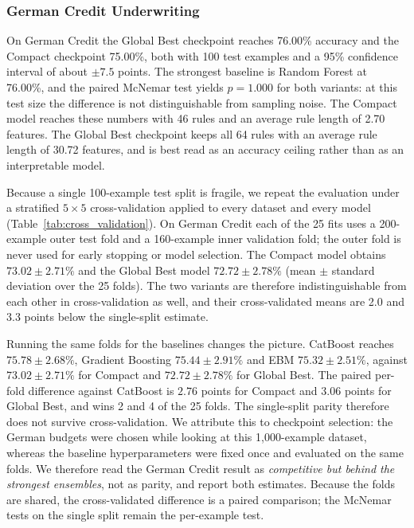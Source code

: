 \subsubsection{German Credit Underwriting}
On German Credit the Global Best checkpoint reaches 76.00\% accuracy and the
Compact checkpoint 75.00\%, both with 100 test examples and a 95\% confidence
interval of about $\pm 7.5$ points. The strongest baseline is Random Forest at
76.00\%, and the paired McNemar test yields $p = 1.000$ for both variants: at
this test size the difference is not distinguishable from sampling noise. The
Compact model reaches these numbers with 46 rules and an average rule length of
2.70 features. The Global Best checkpoint keeps all 64 rules with an average
rule length of 30.72 features, and is best read as an accuracy ceiling rather
than as an interpretable model.

Because a single 100-example test split is fragile, we repeat the evaluation
under a stratified $5\times5$ cross-validation applied to every dataset and every
model (Table~\ref{tab:cross_validation}). On German Credit each of the 25 fits
uses a 200-example outer test fold and a 160-example inner validation fold; the
outer fold is never used for early stopping or model selection. The Compact model
obtains $73.02 \pm 2.71\%$ and the Global Best model $72.72 \pm 2.78\%$ (mean
$\pm$ standard deviation over the 25 folds). The two variants are therefore
indistinguishable from each other in cross-validation as well, and their
cross-validated means are 2.0 and 3.3 points below the single-split estimate.

Running the same folds for the baselines changes the picture. CatBoost reaches
$75.78 \pm 2.68\%$, Gradient Boosting $75.44 \pm 2.91\%$ and EBM
$75.32 \pm 2.51\%$, against $73.02 \pm 2.71\%$ for Compact and
$72.72 \pm 2.78\%$ for Global Best. The paired per-fold difference against
CatBoost is $2.76$ points for Compact and $3.06$ points for Global Best, and
\modelname{} wins 2 and 4 of the 25 folds. The single-split parity therefore does
not survive cross-validation. We attribute this to checkpoint selection: the
German budgets were chosen while looking at this 1{,}000-example dataset, whereas
the baseline hyperparameters were fixed once and evaluated on the same folds. We
therefore read the German Credit result as \emph{competitive but behind the
strongest ensembles}, not as parity, and report both estimates. Because the folds
are shared, the cross-validated difference is a paired comparison; the McNemar
tests on the single split remain the per-example test.

